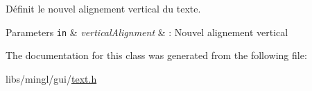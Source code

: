 Définit le nouvel alignement vertical du texte. 


\begin{DoxyParams}[1]{Parameters}
\mbox{\tt in}  & {\em vertical\+Alignment} & \+: Nouvel alignement vertical \\
\hline
\end{DoxyParams}


The documentation for this class was generated from the following file\+:\begin{DoxyCompactItemize}
\item 
libs/mingl/gui/\hyperlink{text_8h}{text.\+h}\end{DoxyCompactItemize}
